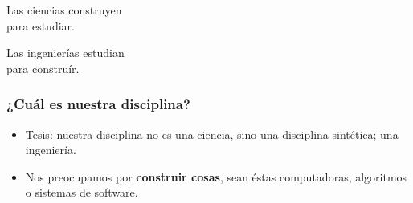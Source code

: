 \documentclass[spanish]{beamer}
\begin{document}
\begin{frame}
  \begin{center}
    \Huge{
      Las ciencias construyen \\
      para estudiar.

      \vspace{2em}

      Las ingenierías estudian \\
      para construír.
    }
  \end{center}
\end{frame}

\begin{frame}
  \frametitle{¿Cuál es nuestra disciplina?}

  \pause

  \begin{itemize}
    \item Tesis: nuestra disciplina no es una ciencia, sino una disciplina
      sintética; una ingeniería.
    \pause

    \item Nos preocupamos por \textbf{construir cosas}, sean éstas
      computadoras, algoritmos o sistemas de software.
  \end{itemize}
\end{frame}
\end{document}

